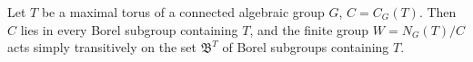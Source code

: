 Let $T$ be a maximal torus of a connected algebraic group $G$, $C = C_G(T)$. Then $C$ lies in every Borel subgroup containing $T$, and the finite group $W = N_G(T)/C$ acts simply transitively on the set $\mathfrak{B}^T$ of Borel subgroups containing $T$.
